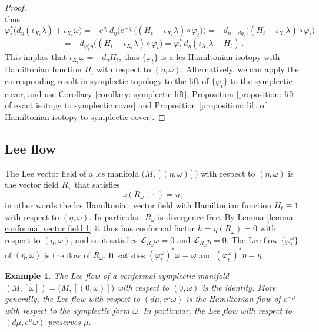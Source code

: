 \documentclass{amsart}
\newtheorem{example}[thm]{Example}
\theoremstyle{remark}
\begin{document}
\begin{proof}
\[\]
thus
\[
\varphi_t^{\ast} \big( d_{\eta} (\iota_{X_t}\lambda) + \iota_{X_t}\omega \big)
= - e^{g_t} \, d_{\eta} \Big(e^{-g_t} \big((H_t - \iota_{X_t}\lambda) \circ \varphi_t \big)\Big)
= - d_{\eta + dg_t} \big((H_t - \iota_{X_t}\lambda) \circ \varphi_t \big)
\]
\[
= - d_{\varphi_t^{\ast}\eta} \big((H_t - \iota_{X_t}\lambda) \circ \varphi_t \big)
= \varphi_t^{\ast} \, d_{\eta} (\iota_{X_t}\lambda - H_t) \,.
\]
This implies that $\iota_{X_t}\omega = - d_{\eta}H_t$,
thus $\{\varphi_t\}$ is a lcs Hamiltonian isotopy
with Hamiltonian function $H_t$ with respect to $(\eta, \omega)$.
Alternatively,
we can apply the corresponding result in symplectic topology
\cite[Proposition 9.3.1]{McDS}
to the lift of $\{\varphi_t\}$
to the symplectic cover,
and use Corollary \ref{corollary: symplectic lift},
Proposition \ref{proposition: lift of exact isotopy to symplectic cover}
and Proposition \ref{proposition: lift of Hamiltonian isotopy to symplectic cover}.
\end{proof}


\subsection{Lee flow}

The Lee vector field of a lcs manifold $\big(M, [(\eta, \omega)]\big)$
with respect to $(\eta, \omega)$
is the vector field $R_{\omega}$ that satisfies
$$
\omega (R_{\omega} \,,\, \cdot\,) = \eta \,,
$$
in other words the lcs Hamiltonian vector field
with Hamiltonian function $H_t \equiv 1$
with respect to $(\eta, \omega)$.
In particular,
$R_{\omega}$ is divergence free.
By Lemma \ref{lemma: conformal vector field 1}
it thus has conformal factor
$h = \eta (R_{\omega}) = 0$ with respect to $(\eta, \omega)$,
and so it satisfies
$\mathcal{L}_{R_{\omega}} \omega = 0$
and $\mathcal{L}_{R_{\omega}} \eta = 0$.
The Lee flow $\{\varphi_t^{\omega}\}$ of $(\eta, \omega)$
is the flow of $R_{\omega}$.
It satisfies
$(\varphi_t^{\omega})^{\ast}\omega = \omega$
and $(\varphi_t^{\omega})^{\ast}\eta = \eta$.

\begin{example}\label{example: Lee flow symplectic}
The Lee flow of a conformal symplectic manifold
$(M, [\omega]) = \big(M , [(0, \omega)]\big)$
with respect to $(0, \omega)$ is the identity.
More generally,
the Lee flow with respect to $(d\mu, e^{\mu}\omega)$
is the Hamiltonian flow of $e^{-\mu}$
with respect to the symplectic form $\omega$.
In particular,
the Lee flow with respect to $(d\mu, e^{\mu}\omega)$
preserves $\mu$.
\end{example}
\end{document}
